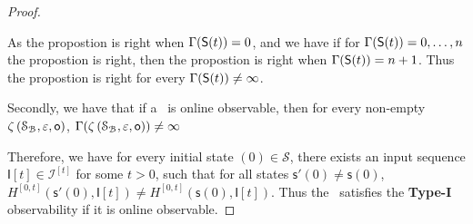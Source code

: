 \begin{appendices}
\begin{proof}
\begin{itemize}
\end{itemize}
As the propostion is right when $\Gamma(\mathsf{S}(t))=0$, and we have if for $\Gamma(\mathsf{S}(t))=0,\ldots, n$ the propostion is right, then the propostion is right when $\Gamma(\mathsf{S}(t))=n+1$. Thus the propostion is right for every $\Gamma(\mathsf{S}(t))\ne\infty$.

Secondly, we have that if a \BCN\ is online observable,
then for every  non-empty $\zeta\left(\mathcal{S}_{\mathcal{B}},\varepsilon, \mathsf{o}\right)$, $\Gamma(\zeta\left(\mathcal{S}_{\mathcal{B}},\varepsilon, \mathsf{o}\right))\ne \infty$

Therefore, we have for every initial state \State$(0)$$\in \mathcal{S}$, there exists an input sequence  $\mathsf{I}[t]\in\mathcal{I}^{[t]}$ for some $t>0$, such that for all states $\mathsf{s}'(0)\neq \mathsf{s}(0)$, $H^{[0,t]}(\mathsf{s}'(0),\mathsf{I}[t])\neq H^{[0,t]}(\mathsf{s}(0), \mathsf{I}[t])$. Thus the \BCN\ satisfies the  {\bf Type-I} observability if it is online observable.
\end{proof}
\end{appendices}
